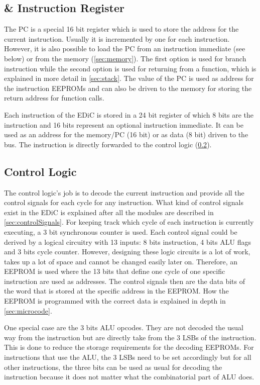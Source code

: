 \subsection{ \& Instruction Register}
The \gls{PC} is a special 16 bit register which is used to store the address for the current instruction.
Usually it is incremented by one for each instruction.
However, it is also possible to load the \gls{PC} from an instruction immediate (see below) or from the memory (\cref{sec:memory}).
The first option is used for branch instruction while the second option is used for returning from a function, which is explained in more detail in \cref{sec:stack}.
The value of the \gls{PC} is used as address for the instruction \glspl{EEPROM} and can also be driven to the memory for storing the return address for function calls.

Each instruction of the \gls{EDiC} is stored in a 24 bit register of which 8 bits are the instruction and 16 bits represent an optional instruction immediate.
It can be used as an address for the memory/\gls{PC} (16 bit) or as data (8 bit) driven to the bus.
The instruction is directly forwarded to the control logic (\cref{sec:control}).

\subsection{Control Logic}\label{sec:control}
The control logic's job is to decode the current instruction and provide all the control signals for each cycle for any instruction.
What kind of control signals exist in the \gls{EDiC} is explained after all the modules are described in \cref{sec:controlSignals}.
For keeping track which cycle of each instruction is currently executing, a 3 bit synchronous counter is used.
Each control signal could be derived by a logical circuitry with 13 inputs: 8 bits instruction, 4 bits \gls{ALU} flags and 3 bits cycle counter.
However, designing these logic circuits is a lot of work, takes up a lot of space and cannot be changed easily later on.
Therefore, an \gls{EEPROM} is used where the 13 bits that define one cycle of one specific instruction are used as addresses.
The control signals then are the data bits of the word that is stored at the specific address in the \gls{EEPROM}.
How the \gls{EEPROM} is programmed with the correct data is explained in depth in \cref{sec:microcode}.

One special case are the 3 bits \gls{ALU} opcodes.
They are not decoded the usual way from the instruction but are directly take from the 3 \glspl{LSB} of the instruction.
This is done to reduce the storage requirements for the decoding \glspl{EEPROM}.
For instructions that use the \gls{ALU}, the 3 \glspl{LSB} need to be set accordingly but for all other instructions, the three bits can be used as usual for decoding the instruction because it does not matter what the combinatorial part of \gls{ALU} does.

